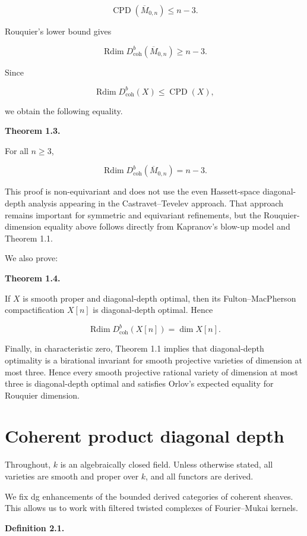 \documentclass[11pt]{amsart}
\theoremstyle{definition}
\begin{document}
\[
\operatorname{CPD}(\overline M_{0,n})\le n-3.
\]

Rouquier's lower bound gives

\[
\operatorname{Rdim}D^b_{\mathrm{coh}}(\overline M_{0,n})\ge n-3.
\]

Since

\[
\operatorname{Rdim}D^b_{\mathrm{coh}}(X)\le \operatorname{CPD}(X),
\]

we obtain the following equality.

\noindent\textbf{Theorem 1.3.}

For all $n\ge3$,

\[
\operatorname{Rdim}D^b_{\mathrm{coh}}(\overline M_{0,n})=n-3.
\]

This proof is non-equivariant and does not use the even Hassett-space diagonal-depth analysis appearing in the Castravet--Tevelev approach. That approach remains important for symmetric and equivariant refinements, but the Rouquier-dimension equality above follows directly from Kapranov's blow-up model and Theorem 1.1.

We also prove:

\noindent\textbf{Theorem 1.4.}

If $X$ is smooth proper and diagonal-depth optimal, then its Fulton--MacPherson compactification $X[n]$ is diagonal-depth optimal. Hence

\[
\operatorname{Rdim}D^b_{\mathrm{coh}}(X[n])=\dim X[n].
\]

Finally, in characteristic zero, Theorem 1.1 implies that diagonal-depth optimality is a birational invariant for smooth projective varieties of dimension at most three. Hence every smooth projective rational variety of dimension at most three is diagonal-depth optimal and satisfies Orlov's expected equality for Rouquier dimension.

\section{Coherent product diagonal depth}

Throughout, $k$ is an algebraically closed field. Unless otherwise stated, all varieties are smooth and proper over $k$, and all functors are derived.

We fix dg enhancements of the bounded derived categories of coherent sheaves. This allows us to work with filtered twisted complexes of Fourier--Mukai kernels.

\noindent\textbf{Definition 2.1.}
\end{document}
